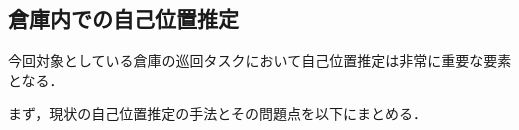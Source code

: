 \subsection{倉庫内での自己位置推定}
\label{map_problem}
今回対象としている倉庫の巡回タスクにおいて自己位置推定は非常に重要な要素となる．

まず，現状の自己位置推定の手法とその問題点を以下にまとめる．


